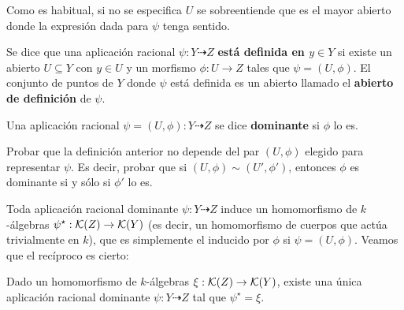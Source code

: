 \documentclass[ACGA.tex]{subfiles}
\begin{document}
Como es habitual, si no se especifica $U$ se sobreentiende que es el mayor abierto donde la expresión dada para $\psi$ tenga sentido.

\begin{defi}
 Se dice que una aplicación racional $\psi:Y\dashrightarrow Z$ {\bf está definida en $y\in Y$} si existe un abierto $U\subseteq Y$ con $y\in U$ y un morfismo $\phi:U\to Z$ tales que $\psi=(U,\phi)$. El conjunto de puntos de $Y$ donde $\psi$ está definida es un abierto llamado el {\bf abierto de definición} de $\psi$.
\end{defi}

\begin{defi}
 Una aplicación racional $\psi=(U,\phi):Y\dashrightarrow Z$ se dice {\bf dominante} si $\phi$ lo es.
\end{defi}

\begin{ejer}
 Probar que la definición anterior no depende del par $(U,\phi)$ elegido para representar $\psi$. Es decir, probar que si $(U,\phi)\sim(U',\phi')$, entonces $\phi$ es dominante si y sólo si $\phi'$ lo es.
\end{ejer}

Toda aplicación racional dominante $\psi:Y\dashrightarrow Z$ induce un homomorfismo de $k$-álgebras $\psi^\star:{\mathcal K}(Z)\to{\mathcal K}(Y)$ (es decir, un homomorfismo de cuerpos que actúa trivialmente en $k$), que es simplemente el inducido por $\phi$ si $\psi=(U,\phi)$. Veamos que el recíproco es cierto:

\begin{prop}\label{morfismoaracional}
 Dado un homomorfismo de $k$-álgebras $\xi:{\mathcal K}(Z)\to{\mathcal K}(Y)$, existe una única aplicación racional dominante $\psi:Y\dashrightarrow Z$ tal que $\psi^\star=\xi$.
\end{prop}
\end{document}
